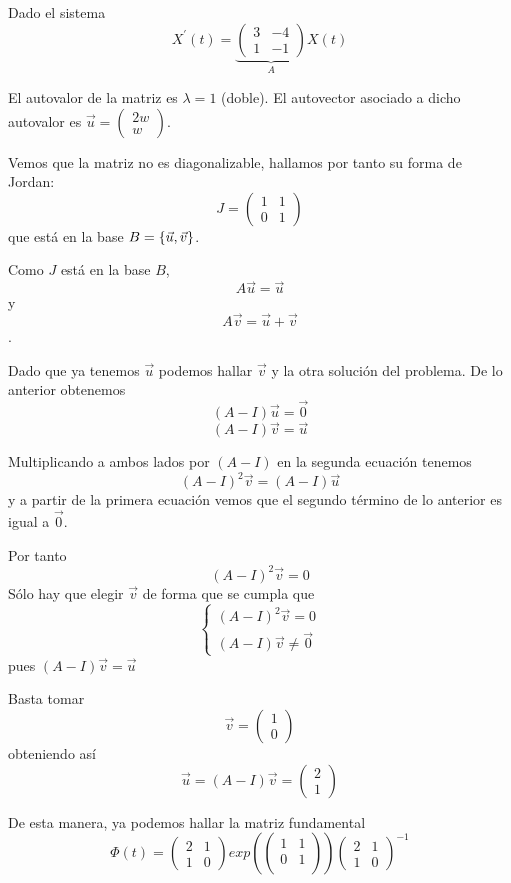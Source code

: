 \documentclass{mathnotes}
\begin{document}
\begin{example}
Dado el sistema $$X^\prime(t) = \underbrace{\begin{pmatrix}
3 & -4\\1 &-1
\end{pmatrix}}_A X(t)$$

El autovalor de la matriz es $\lambda = 1$ (doble). El autovector asociado a dicho autovalor es $\vec{u}=\begin{pmatrix}
2w\\w
\end{pmatrix}$.

Vemos que la matriz no es diagonalizable, hallamos por tanto su forma de Jordan: $$J = \begin{pmatrix}
1 & 1\\0 & 1
\end{pmatrix}$$ que está en la base $B = \{ \vec{u}, \vec{v} \}$.

Como $J$ está en la base $B$, $$A\vec{u} = \vec{u}$$
y  $$A\vec{v}= \vec{u}+\vec{v}$$. 

Dado que ya tenemos $\vec{u}$ podemos hallar $\vec{v}$ y la otra solución del problema. De lo anterior obtenemos 
$$(A-I)\vec{u} = \vec{0}$$
$$(A-I)\vec{v} = \vec{u}$$

Multiplicando a ambos lados por $(A-I)$ en la segunda ecuación tenemos $$(A-I)^2\vec{v} = (A-I)\vec{u}$$ y a partir de la primera ecuación vemos que el segundo término de lo anterior es igual a $\vec{0}$.

Por tanto $$(A-I)^2\vec{v} = 0$$
Sólo hay que elegir $\vec{v}$ de forma que se cumpla que 
\begin{equation*}
  \left\lbrace
  \begin{array}{l}
	(A-I)^2\vec{v} = 0\\
	(A-I)\vec{v} \neq \vec{0}
  \end{array}
  \right.
\end{equation*}
pues $(A-I)\vec{v} = \vec{u}$

Basta tomar $$\vec{v} = \begin{pmatrix}
1 \\ 0
\end{pmatrix}$$
obteniendo así $$\vec{u} = (A-I)\vec{v}  = \begin{pmatrix}
2\\1
\end{pmatrix}$$

De esta manera, ya podemos hallar la matriz fundamental
$$\Phi(t) = \begin{pmatrix}
2 & 1\\1 & 0
\end{pmatrix}exp(\begin{pmatrix}
1 & 1\\0 & 1\\
\end{pmatrix})\begin{pmatrix}
2 & 1\\1 & 0
\end{pmatrix}^{-1}$$


\end{example}
\end{document}
